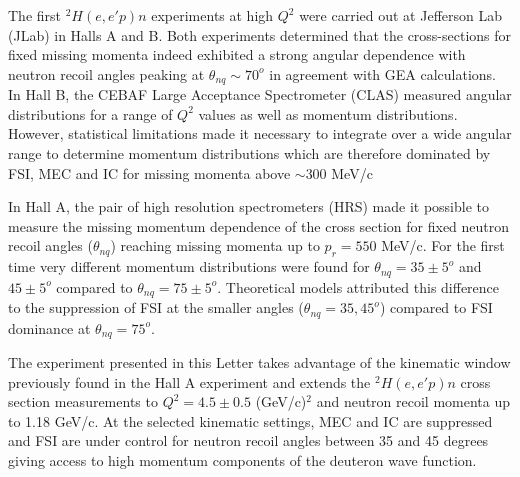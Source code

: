 The first $^{2}H(e,e'p)n$ experiments at high $Q^{2}$ were carried out at Jefferson Lab (JLab) in Halls A\cite{PhysRevLett.89.062301} and B\cite{PhysRevLett.98.262502}. Both
experiments determined that the cross-sections for fixed missing momenta indeed exhibited a strong angular dependence with neutron recoil angles peaking
at $\theta_{nq} \sim 70^{o}$ in agreement with GEA\cite{Sargsian_2001,PhysRevC.56.1124} calculations. In Hall B, the CEBAF Large Acceptance Spectrometer (CLAS) measured angular distributions for  a range of $Q^2$ values as well as momentum distributions. However, statistical limitations made it necessary to integrate over a wide angular range to determine momentum distributions which are therefore dominated by  FSI, MEC and IC for missing momenta above $\sim 300$ MeV/c

In Hall A, the pair of high resolution spectrometers (HRS) made it possible to measure the missing  momentum dependence of the cross section for fixed neutron recoil angles ($\theta_{nq}$) reaching missing momenta up to $p_{r}=550$ MeV/c. For the first time very different momentum distributions were found for $\theta_{nq}=35\pm5^{o}$
and $45\pm5^{o}$ compared to  $\theta_{nq}=75\pm5^{o}$. Theoretical models attributed this difference  to the suppression of FSI at the smaller angles ($\theta_{nq}=35, 45^{o}$) compared to FSI dominance at $\theta_{nq}=75^{o}$\cite{PhysRevLett.107.262501}.

The experiment presented in this Letter takes advantage of the kinematic window previously found in the Hall A experiment and extends the $^{2}H(e,e'p)n$ cross section measurements
to $Q^{2}=4.5\pm0.5$ (GeV/c)$^{2}$ and neutron recoil momenta up to 1.18 GeV/c. At the selected kinematic settings, MEC and IC are suppressed and FSI are under control for neutron recoil angles between 35 and 45 degrees giving access to high momentum components of the deuteron wave function.


